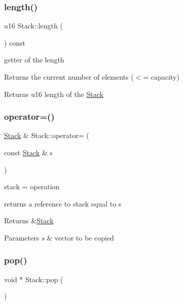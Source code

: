 \subsubsection{\texorpdfstring{length()}{length()}}
{\footnotesize\ttfamily u16 Stack\+::length (\begin{DoxyParamCaption}{ }\end{DoxyParamCaption}) const}



getter of the length 

Returns the current number of elements ($<$= capacity)

\begin{DoxyReturn}{Returns}
u16 length of the \hyperlink{class_stack}{Stack} 
\end{DoxyReturn}
\mbox{\label{class_stack_a673ed59047b6764946b7db209fef7dab}} 
\subsubsection{\texorpdfstring{operator=()}{operator=()}}
{\footnotesize\ttfamily \hyperlink{class_stack}{Stack} \& Stack\+::operator= (\begin{DoxyParamCaption}\item[{const \hyperlink{class_stack}{Stack} \&}]{s }\end{DoxyParamCaption})}



stack = operation 

returns a reference to stack equal to s

\begin{DoxyReturn}{Returns}
\&\hyperlink{class_stack}{Stack} 
\end{DoxyReturn}

\begin{DoxyParams}{Parameters}
{\em s} & vector to be copied \\
\hline
\end{DoxyParams}
\mbox{\label{class_stack_a3d88defdf19383864b519080c02c9f16}} 
\subsubsection{\texorpdfstring{pop()}{pop()}}
{\footnotesize\ttfamily void $\ast$ Stack\+::pop (\begin{DoxyParamCaption}{ }\end{DoxyParamCaption})}



